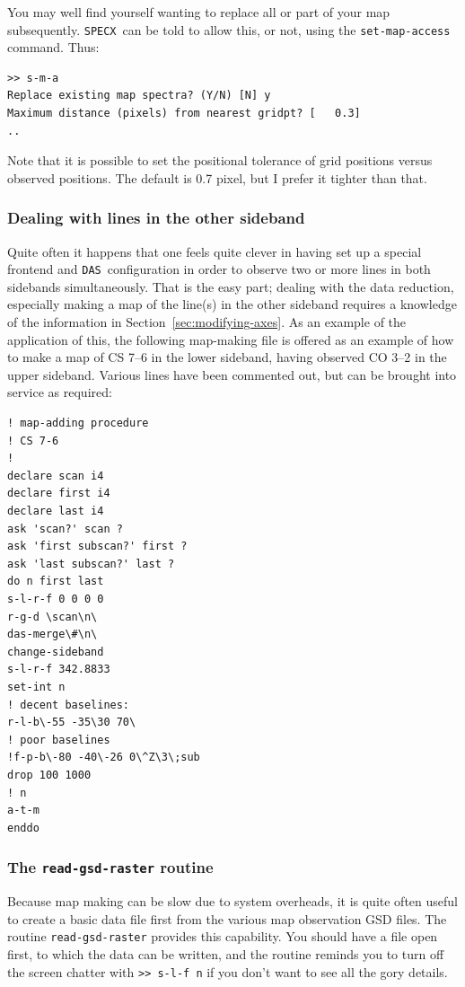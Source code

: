 \documentclass[11pt,twoside]{article}
\newcommand{\SPECX}{{\tt SPECX}}
\newcommand{\das}{{\tt DAS}}
\begin{document}
You may well find yourself wanting to replace all or part of your map
subsequently. \SPECX\ can be told to allow this, or not, using the
{\tt set-map-access} command. Thus:
\begin{verbatim}
>> s-m-a
Replace existing map spectra? (Y/N) [N] y
Maximum distance (pixels) from nearest gridpt? [   0.3]
..
\end{verbatim}
Note that it is possible to set the positional tolerance of grid
positions versus observed positions. The default is 0.7 pixel, but I
prefer it tighter than that.

\subsubsection{Dealing with lines in the other sideband}
\label{sec:other-sideband-maps}
Quite often it happens that one feels quite clever in having set up a
special frontend and \das\ configuration in order to observe two or
more lines in both sidebands simultaneously. That is the easy part;
dealing with the data reduction, especially making a map of the
line(s) in the other sideband requires a knowledge of the information
in Section~\ref{sec:modifying-axes}. As an example of the application
of this, the following map-making file is offered as an example of how
to make a map of CS 7--6 in the lower sideband, having observed CO
3--2 in the upper sideband. Various lines have been commented out, but
can be brought into service as required:
\begin{verbatim}
! map-adding procedure
! CS 7-6
!
declare scan i4
declare first i4
declare last i4
ask 'scan?' scan ?
ask 'first subscan?' first ?
ask 'last subscan?' last ?
do n first last
s-l-r-f 0 0 0 0
r-g-d \scan\n\
das-merge\#\n\
change-sideband
s-l-r-f 342.8833
set-int n
! decent baselines:
r-l-b\-55 -35\30 70\
! poor baselines
!f-p-b\-80 -40\-26 0\^Z\3\;sub
drop 100 1000
! n
a-t-m
enddo
\end{verbatim}

\subsubsection{The {\tt read-gsd-raster} routine}
\label{sec:r-g-r}
Because map making can be slow due to system overheads, it is quite
often useful to create a basic data file first from the various map
observation GSD files. The routine {\tt read-gsd-raster} provides this
capability. You should have a file open first, to which the data can
be written, and the routine reminds you to turn off the screen chatter
with \verb|>> s-l-f n| if you don't want to see all the gory details.
\end{document}
